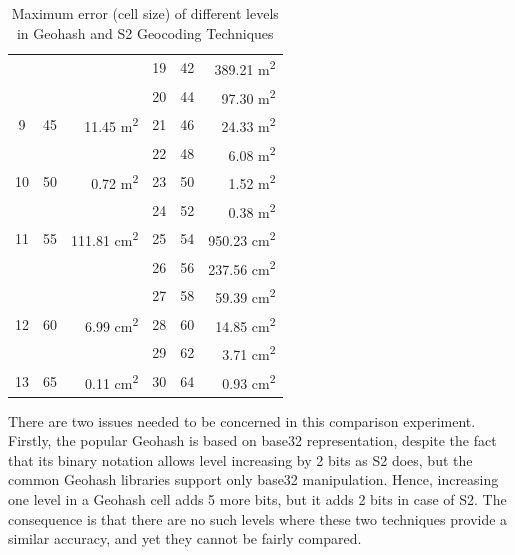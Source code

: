 \begin{table}[htb!]
\begin{tabular}{|c|c|r||c|c|r|}
    & & & 19 & 42 & 389.21 m\textsuperscript{2} \\
    & & & 20 & 44 & 97.30 m\textsuperscript{2} \\
    9 & 45 & 11.45 m\textsuperscript{2} & 21 & 46 & 24.33 m\textsuperscript{2} \\
    & & & 22 & 48 & 6.08 m\textsuperscript{2} \\
    10 & 50 & 0.72 m\textsuperscript{2} & 23 & 50 & 1.52 m\textsuperscript{2} \\
    & & & 24 & 52 & 0.38 m\textsuperscript{2} \\
    11 & 55 & 111.81 cm\textsuperscript{2} & 25 & 54 & 950.23 cm\textsuperscript{2} \\
    & & & 26 & 56 & 237.56 cm\textsuperscript{2} \\
    & & & 27 & 58 & 59.39 cm\textsuperscript{2} \\
    12 & 60 & 6.99 cm\textsuperscript{2} & 28 & 60 & 14.85 cm\textsuperscript{2} \\
    & & & 29 & 62 & 3.71 cm\textsuperscript{2} \\
    13 & 65 & 0.11 cm\textsuperscript{2} & 30 & 64 & 0.93 cm\textsuperscript{2} \\
    \hline
  \end{tabular}
  \caption{Maximum error (cell size) of different levels in Geohash and S2 Geocoding Techniques}
  \label{tab:GeohashS2Size}
\end{table}

\npara There are two issues needed to be concerned in this comparison experiment.
Firstly, the popular Geohash is based on base32 representation, despite the fact that its binary notation allows level increasing by 2 bits as S2 does, but the common Geohash libraries support only base32 manipulation.
Hence, increasing one level in a Geohash cell adds 5 more bits, but it adds 2 bits in case of S2.
The consequence is that there are no such levels where these two techniques provide a similar accuracy, and yet they cannot be fairly compared.

